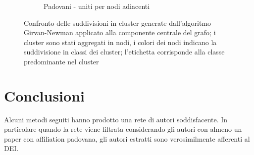 \documentclass[12pt,a4paper,twoside]{report}
\begin{document}
\begin{figure}[ht]
\begin{subfigure}[b]{0.5\textwidth}
                \caption{Padovani - uniti per nodi adiacenti}
        \end{subfigure}%
    \caption{Confronto delle suddivisioni in cluster generate dall'algoritmo Girvan-Newman applicato
    alla componente centrale del grafo; i cluster sono stati aggregati in nodi, i colori dei nodi
    indicano la suddivisione in classi dei cluster; l'etichetta corrisponde alla classe
    predominante nel cluster}
    \label{fig:grafigirvanaggregati}
\end{figure}





\whitePage
\chapter{Conclusioni} \label{cap:conclusioni}

Alcuni metodi seguiti hanno prodotto una rete di autori soddisfacente. In particolare quando la rete
viene filtrata considerando gli autori con almeno un paper con affiliation padovana, gli autori
estratti sono verosimilmente afferenti al DEI.
\end{document}
